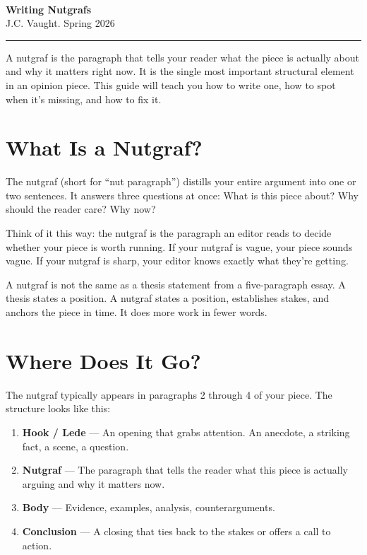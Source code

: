 \documentclass[12pt]{article}
\newcommand{\doctitle}{%
    \noindent{\LARGE\bfseries Daily Gamecock \textit{Opinion}}\\[2pt]
    {\LARGE\bfseries Writing Nutgrafs}\\[4pt]
    {\normalsize J.C. Vaught. Spring 2026}\\[-2pt]
    \noindent\rule{\textwidth}{1pt}
    \vspace{8pt}
}
\begin{document}
\thispagestyle{plain}

\doctitle

\begin{keybox}
A nutgraf is the paragraph that tells your reader what the piece is actually about and why it matters right now. It is the single most important structural element in an opinion piece. This guide will teach you how to write one, how to spot when it's missing, and how to fix it.
\end{keybox}

\section*{What Is a Nutgraf?}

The nutgraf (short for ``nut paragraph'') distills your entire argument into one or two sentences. It answers three questions at once: What is this piece about? Why should the reader care? Why now?

Think of it this way: the nutgraf is the paragraph an editor reads to decide whether your piece is worth running. If your nutgraf is vague, your piece sounds vague. If your nutgraf is sharp, your editor knows exactly what they're getting.

A nutgraf is not the same as a thesis statement from a five-paragraph essay. A thesis states a position. A nutgraf states a position, establishes stakes, and anchors the piece in time. It does more work in fewer words.

\section*{Where Does It Go?}

The nutgraf typically appears in paragraphs 2 through 4 of your piece. The structure looks like this:

\begin{enumerate}[leftmargin=*]
    \item \textbf{Hook / Lede} --- An opening that grabs attention. An anecdote, a striking fact, a scene, a question.
    \item \textbf{Nutgraf} --- The paragraph that tells the reader what this piece is actually arguing and why it matters now.
    \item \textbf{Body} --- Evidence, examples, analysis, counterarguments.
    \item \textbf{Conclusion} --- A closing that ties back to the stakes or offers a call to action.
\end{enumerate}
\end{document}
